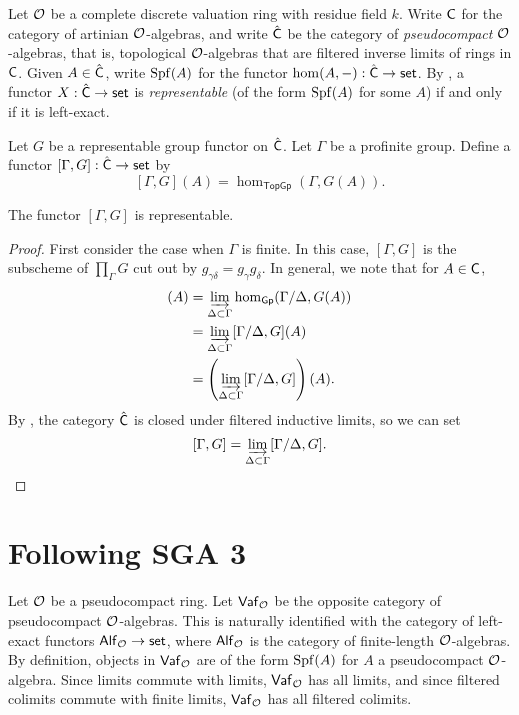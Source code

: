 \documentclass[phd,cornellheadings,draft]{cornell}
\begin{document}
Let $\mathcal{O}$ be a complete discrete valuation ring with residue field $k$. Write 
$\mathsf{C}$ for the category of artinian $\mathcal{O}$-algebras, and write 
$\hat{\mathsf{C}}$ be the category of \emph{pseudocompact} $\mathcal{O}$-algebras, that is, 
topological $\mathcal{O}$-algebras that are filtered inverse limits of rings in 
$\mathsf{C}$. Given $A\in \hat{\mathsf{C}}$, write $\operatorname{Spf}(A)$ for the 
functor $\hom(A,-):\hat{\mathsf{C}}\to \mathsf{set}$. By 
\cite[$\mathrm{VII_B}$ \S 0.4]{sga3-i}, a functor $X:\hat{\mathsf{C}}\to \mathsf{set}$ is 
\emph{representable} (of the form $\operatorname{Spf}(A)$ for some $A$) if and 
only if it is left-exact. 

Let $G$ be a representable group functor on $\hat{\mathsf{C}}$. 
Let $\Gamma$ be a profinite group. 
Define a functor $[\Gamma,G]:\hat{\mathsf{C}}\to \mathsf{set}$ by 
\[
  [\Gamma,G](A) = \hom_\mathsf{TopGp}(\Gamma,G(A)) .
\]
\begin{proposition}
The functor $[\Gamma,G]$ is representable. 
\end{proposition}
\begin{proof}
First consider the case when $\Gamma$ is finite. In this case, 
$[\Gamma,G]$ is the subscheme of $\prod_\Gamma G$ cut out by 
$g_{\gamma\delta} = g_\gamma g_\delta$. In general, we note that for 
$A\in \mathsf{C}$, 
\begin{align*}
  [\Gamma,G](A) 
    &= \varinjlim_{\Delta\subset \Gamma} \hom_\mathsf{Gp}(\Gamma/\Delta,G(A)) \\
    &= \varinjlim_{\Delta\subset \Gamma} [\Gamma/\Delta,G](A) \\
    &= \left(\varinjlim_{\Delta\subset \Gamma} [\Gamma/\Delta,G]\right)(A) .
\end{align*}
By \cite[$\mathrm{VII_B}$ 1.2.B]{sga3-i}, the category $\hat{\mathsf{C}}$ is 
closed under filtered inductive limits, so we can set 
\[
  [\Gamma,G] = \varinjlim_{\Delta\subset \Gamma} [\Gamma/\Delta,G] .
\]
\end{proof}





\section{Following SGA 3}

Let $\mathcal{O}$ be a pseudocompact ring. Let $\mathsf{Vaf}_{\mathcal{O}}$ be the opposite 
category of pseudocompact $\mathcal{O}$-algebras. This is naturally identified with the 
category of left-exact functors $\mathsf{Alf}_{\mathcal{O}}\to \mathsf{set}$, where 
$\mathsf{Alf}_{\mathcal{O}}$ is the category of finite-length $\mathcal{O}$-algebras. By 
definition, objects in $\mathsf{Vaf}_{\mathcal{O}}$ are of the form 
$\operatorname{Spf}(A)$ for $A$ a pseudocompact $\mathcal{O}$-algebra. Since limits 
commute with limits, $\mathsf{Vaf}_{\mathcal{O}}$ has all limits, and since 
filtered colimits commute with finite limits, $\mathsf{Vaf}_{\mathcal{O}}$ has all 
filtered colimits. 
\end{document}
